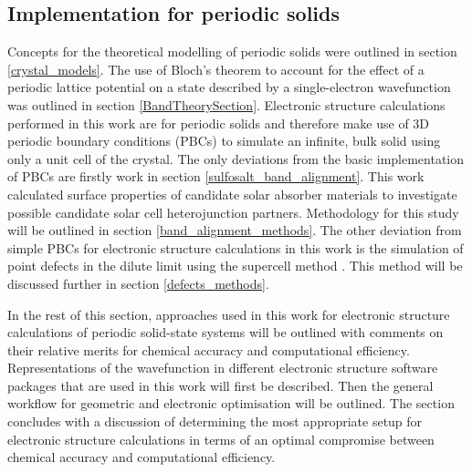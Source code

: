 \documentclass[11pt, twoside]{report}
\begin{document}


\subsection{Implementation for periodic solids}

Concepts for the theoretical modelling of periodic solids were outlined in section \ref{crystal_models}. The use of Bloch's theorem to account for the effect of a periodic lattice potential on a state described by a single-electron wavefunction was outlined in section \ref{BandTheorySection}. Electronic structure calculations performed in this work are for periodic solids and therefore make use of 3D periodic boundary conditions (PBCs) to simulate an infinite, bulk solid using only a unit cell of the crystal. The only deviations from the basic implementation of PBCs are firstly work in section \ref{sulfosalt_band_alignment}. This work calculated surface properties of candidate solar absorber materials to investigate possible candidate solar cell heterojunction partners. Methodology for this study will be outlined in section \ref{band_alignment_methods}. The other deviation from simple PBCs for electronic structure calculations in this work is the simulation of point defects in the dilute limit using the supercell method \cite{SupercellMethodDefects}. This method will be discussed further in section \ref{defects_methods}. 

In the rest of this section, approaches used in this work for electronic structure calculations of periodic solid-state systems will be outlined with comments on their relative merits for chemical accuracy and computational efficiency. Representations of the wavefunction in different electronic structure software packages that are used in this work will first be described. Then the general workflow for geometric and electronic optimisation will be outlined. The section concludes with a discussion of determining the most appropriate setup for electronic structure calculations in terms of an optimal compromise between chemical accuracy and computational efficiency.

\end{document}
